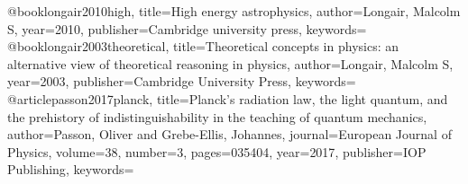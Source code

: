 @book{longair2010high,
  title={High energy astrophysics},
  author={Longair, Malcolm S},
  year={2010},
  publisher={Cambridge university press},
keywords={}
}
@book{longair2003theoretical,
  title={Theoretical concepts in physics: an alternative view of theoretical reasoning in physics},
  author={Longair, Malcolm S},
  year={2003},
  publisher={Cambridge University Press},
  keywords={}
}
@article{passon2017planck,
  title={Planck’s radiation law, the light quantum, and the prehistory of indistinguishability in the teaching of quantum mechanics},
  author={Passon, Oliver and Grebe-Ellis, Johannes},
  journal={European Journal of Physics},
  volume={38},
  number={3},
  pages={035404},
  year={2017},
  publisher={IOP Publishing},
  keywords={}
}
